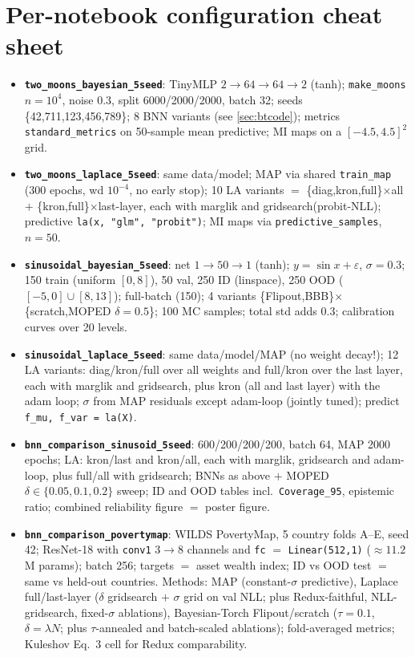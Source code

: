 \documentclass[10pt,a4paper]{article}
\newcommand{\code}[1]{\texttt{#1}}
\begin{document}
\section{Per-notebook configuration cheat sheet}\label{sec:cheat}
\begin{itemize}
\item \textbf{\code{two\_moons\_bayesian\_5seed}}: TinyMLP $2{\to}64{\to}64{\to}2$ (tanh);
  \code{make\_moons} $n{=}10^4$, noise $0.3$, split 6000/2000/2000, batch 32; seeds
  \{42,711,123,456,789\}; 8 BNN variants (see \ref{sec:btcode}); metrics
  \code{standard\_metrics} on 50-sample mean predictive; MI maps on a $[-4.5,4.5]^2$ grid.
\item \textbf{\code{two\_moons\_laplace\_5seed}}: same data/model; MAP via shared
  \code{train\_map} (300 epochs, wd $10^{-4}$, no early stop); 10 LA variants $=$
  \{diag,kron,full\}$\times$all $+$ \{kron,full\}$\times$last-layer, each with
  marglik and gridsearch(probit-NLL); predictive \code{la(x, "glm", "probit")}; MI maps via
  \code{predictive\_samples}, $n{=}50$.
\item \textbf{\code{sinusoidal\_bayesian\_5seed}}: net $1{\to}50{\to}1$ (tanh);
  $y=\sin x+\varepsilon$, $\sigma{=}0.3$; 150 train (uniform $[0,8]$), 50 val, 250 ID
  (linspace), 250 OOD ($[-5,0]\cup[8,13]$); full-batch (150); 4 variants
  \{Flipout,BBB\}$\times$\{scratch,MOPED $\delta{=}0.5$\}; 100 MC samples; total std adds
  $0.3$; calibration curves over 20 levels.
\item \textbf{\code{sinusoidal\_laplace\_5seed}}: same data/model/MAP (no weight decay!);
  12 LA variants: diag/kron/full over all weights and full/kron over the last layer, each with
  marglik and gridsearch, plus kron (all and last layer) with the adam loop; $\sigma$ from MAP
  residuals except adam-loop (jointly tuned); predict \code{f\_mu, f\_var = la(X)}.
\item \textbf{\code{bnn\_comparison\_sinusoid\_5seed}}: 600/200/200/200, batch 64, MAP 2000
  epochs; LA: kron/last and kron/all, each with marglik, gridsearch and adam-loop, plus
  full/all with gridsearch; BNNs as above $+$ MOPED
  $\delta\in\{0.05,0.1,0.2\}$ sweep; ID and OOD tables incl.\ \code{Coverage\_95}, epistemic
  ratio; combined reliability figure $=$ poster figure.
\item \textbf{\code{bnn\_comparison\_povertymap}}: WILDS PovertyMap, 5 country folds A--E,
  seed 42; ResNet-18 with \code{conv1} $3{\to}8$ channels and \code{fc} $=$
  \code{Linear(512,1)} ($\approx11.2$M params); batch 256; targets $=$ asset wealth index;
  ID vs OOD test $=$ same vs held-out countries. Methods: MAP (constant-$\sigma$ predictive),
  Laplace full/last-layer ($\delta$ gridsearch $+$ $\sigma$ grid on val NLL; plus
  Redux-faithful, NLL-gridsearch, fixed-$\sigma$ ablations), Bayesian-Torch Flipout/scratch
  ($\tau{=}0.1$, $\delta{=}\lambda N$; plus $\tau$-annealed and batch-scaled ablations);
  fold-averaged metrics; Kuleshov Eq.~3 cell for Redux comparability.
\end{itemize}
\end{document}
